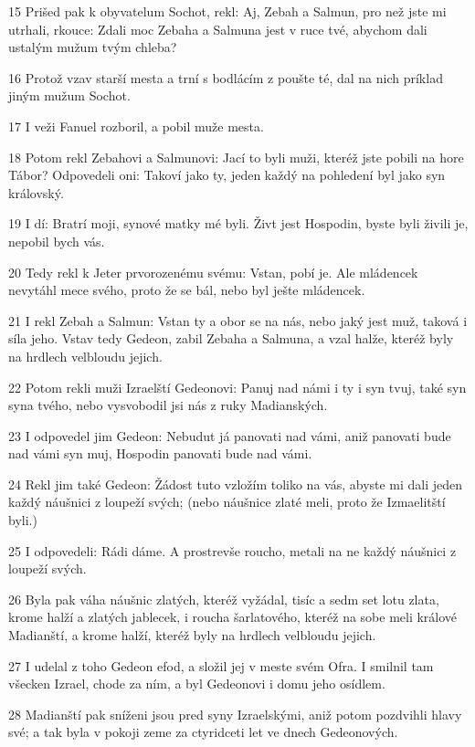 \par 15 Prišed pak k obyvatelum Sochot, rekl: Aj, Zebah a Salmun, pro než jste mi utrhali, rkouce: Zdali moc Zebaha a Salmuna jest v ruce tvé, abychom dali ustalým mužum tvým chleba?
\par 16 Protož vzav starší mesta a trní s bodlácím z poušte té, dal na nich príklad jiným mužum Sochot.
\par 17 I veži Fanuel rozboril, a pobil muže mesta.
\par 18 Potom rekl Zebahovi a Salmunovi: Jací to byli muži, kteréž jste pobili na hore Tábor? Odpovedeli oni: Takoví jako ty, jeden každý na pohledení byl jako syn královský.
\par 19 I dí: Bratrí moji, synové matky mé byli. Živt jest Hospodin, byste byli živili je, nepobil bych vás.
\par 20 Tedy rekl k Jeter prvorozenému svému: Vstan, pobí je. Ale mládencek nevytáhl mece svého, proto že se bál, nebo byl ješte mládencek.
\par 21 I rekl Zebah a Salmun: Vstan ty a obor se na nás, nebo jaký jest muž, taková i síla jeho. Vstav tedy Gedeon, zabil Zebaha a Salmuna, a vzal halže, kteréž byly na hrdlech velbloudu jejich.
\par 22 Potom rekli muži Izraelští Gedeonovi: Panuj nad námi i ty i syn tvuj, také syn syna tvého, nebo vysvobodil jsi nás z ruky Madianských.
\par 23 I odpovedel jim Gedeon: Nebudut já panovati nad vámi, aniž panovati bude nad vámi syn muj, Hospodin panovati bude nad vámi.
\par 24 Rekl jim také Gedeon: Žádost tuto vzložím toliko na vás, abyste mi dali jeden každý náušnici z loupeží svých; (nebo náušnice zlaté meli, proto že Izmaelitští byli.)
\par 25 I odpovedeli: Rádi dáme. A prostrevše roucho, metali na ne každý náušnici z loupeží svých.
\par 26 Byla pak váha náušnic zlatých, kteréž vyžádal, tisíc a sedm set lotu zlata, krome halží a zlatých jablecek, i roucha šarlatového, kteréž na sobe meli králové Madianští, a krome halží, kteréž byly na hrdlech velbloudu jejich.
\par 27 I udelal z toho Gedeon efod, a složil jej v meste svém Ofra. I smilnil tam všecken Izrael, chode za ním, a byl Gedeonovi i domu jeho osídlem.
\par 28 Madianští pak sníženi jsou pred syny Izraelskými, aniž potom pozdvihli hlavy své; a tak byla v pokoji zeme za ctyridceti let ve dnech Gedeonových.
